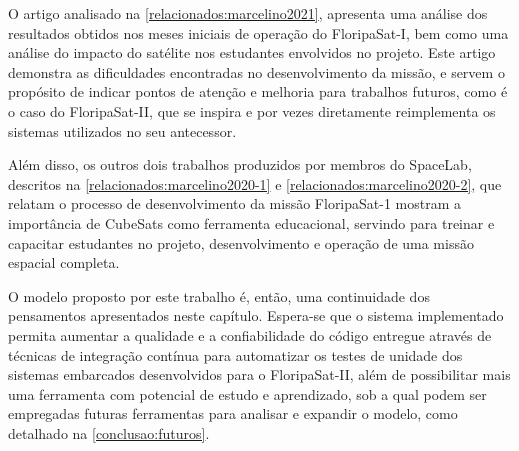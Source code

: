 O artigo analisado na \autoref{relacionados:marcelino2021}, apresenta uma análise dos resultados obtidos nos meses iniciais de operação do FloripaSat-I, bem como uma análise do impacto do satélite nos estudantes envolvidos no projeto. Este artigo demonstra as dificuldades encontradas no desenvolvimento da missão, e servem o propósito de indicar pontos de atenção e melhoria para trabalhos futuros, como é o caso do FloripaSat-II, que se inspira e por vezes diretamente reimplementa os sistemas utilizados no seu antecessor.

Além disso, os outros dois trabalhos produzidos por membros do SpaceLab, descritos na \autoref{relacionados:marcelino2020-1} e \autoref{relacionados:marcelino2020-2}, que relatam o processo de desenvolvimento da missão FloripaSat-1 mostram a importância de CubeSats como ferramenta educacional, servindo para treinar e capacitar estudantes no projeto, desenvolvimento e operação de uma missão espacial completa.

O modelo proposto por este trabalho é, então, uma continuidade dos pensamentos apresentados neste capítulo. Espera-se que o sistema implementado permita aumentar a qualidade e a confiabilidade do código entregue através de técnicas de integração contínua para automatizar os testes de unidade dos sistemas embarcados desenvolvidos para o FloripaSat-II, além de possibilitar mais uma ferramenta com potencial de estudo e aprendizado, sob a qual podem ser empregadas futuras ferramentas para analisar e expandir o modelo, como detalhado na \autoref{conclusao:futuros}.

